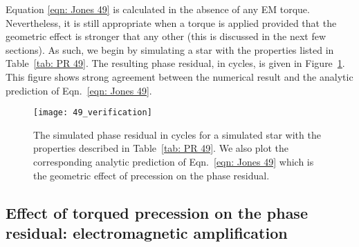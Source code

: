 \documentclass[../full_thesis/full_thesis.tex]{subfiles}
\newcommand{\thisdir}{../inertial_frame}
\begin{document}
Equation \eqref{eqn: Jones 49} is calculated in the absence of any EM torque.
Nevertheless, it is still appropriate when a torque is applied provided
that the geometric effect is stronger that any other (this is discussed in
the next few sections). As such, we begin by simulating a star with the
properties listed in Table~\ref{tab: PR 49}.
The resulting phase residual, in cycles, is given in Figure~\ref{fig: PR 49}.
This figure shows strong agreement between the numerical result and the
analytic prediction of Eqn.~\eqref{eqn: Jones 49}.

\begin{table}[htb]
\centering

\caption{Simulation parameters used for the phase residual plotted in
Figure~\ref{fig: PR 49}. Note that $\Aem$ is the electromagnetic amplification
factor defined later in Eqn.~\eqref{eqn: EM amplification}.}
\label{tab: PR 49}
\end{table}

\begin{figure}[htb]
\centering
\texttt{[image: 49\_verification]}
\caption{The simulated phase residual in cycles for a simulated star with the
properties described in Table~\ref{tab: PR 49}. We also plot the corresponding
analytic prediction of Eqn.~\eqref{eqn: Jones 49} which is the geometric effect
of precession on the phase residual.}
\label{fig: PR 49}
\end{figure}

\subsection{Effect of torqued precession on the phase residual: electromagnetic amplification}
\label{sec: phase residual torqued}
\end{document}

